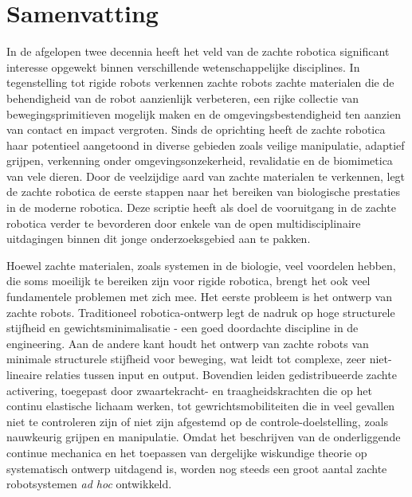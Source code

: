 \chapter*{Samenvatting}
\vspace{-10mm}
In de afgelopen twee decennia heeft het veld van de zachte robotica significant interesse opgewekt binnen verschillende wetenschappelijke disciplines. In tegenstelling tot rigide robots verkennen zachte robots zachte materialen die de behendigheid van de robot aanzienlijk verbeteren, een rijke collectie van bewegingsprimitieven mogelijk maken en de omgevingsbestendigheid ten aanzien van contact en impact vergroten. Sinds de oprichting heeft de zachte robotica haar potentieel aangetoond in diverse gebieden zoals veilige manipulatie, adaptief grijpen, verkenning onder omgevingsonzekerheid, revalidatie en de biomimetica van vele dieren. Door de veelzijdige aard van zachte materialen te verkennen, legt de zachte robotica de eerste stappen naar het bereiken van biologische prestaties in de moderne robotica. Deze scriptie heeft als doel de vooruitgang in de zachte robotica verder te bevorderen door enkele van de open multidisciplinaire uitdagingen binnen dit jonge onderzoeksgebied aan te pakken.

Hoewel zachte materialen, zoals systemen in de biologie, veel voordelen hebben, die soms moeilijk te bereiken zijn voor rigide robotica, brengt het ook veel fundamentele problemen met zich mee. Het eerste probleem is het ontwerp van zachte robots. Traditioneel robotica-ontwerp legt de nadruk op hoge structurele stijfheid en gewichtsminimalisatie - een goed doordachte discipline in de engineering. Aan de andere kant houdt het ontwerp van zachte robots van minimale structurele stijfheid voor beweging, wat leidt tot complexe, zeer niet-lineaire relaties tussen input en output. Bovendien leiden gedistribueerde zachte activering, toegepast door zwaartekracht- en traagheidskrachten die op het continu elastische lichaam werken, tot gewrichtsmobiliteiten die in veel gevallen niet te controleren zijn of niet zijn afgestemd op de controle-doelstelling, zoals nauwkeurig grijpen en manipulatie. Omdat het beschrijven van de onderliggende continue mechanica en het toepassen van dergelijke wiskundige theorie op systematisch ontwerp uitdagend is, worden nog steeds een groot aantal zachte robotsystemen \textit{ad hoc} ontwikkeld.


